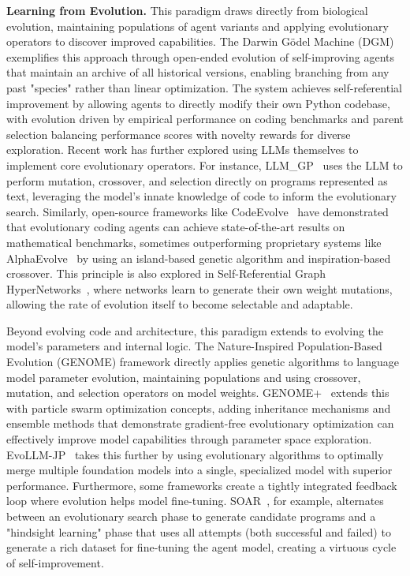 \textbf{Learning from Evolution.} 
This paradigm draws directly from biological evolution, maintaining populations of agent variants and applying evolutionary operators to discover improved capabilities. The Darwin Gödel Machine (DGM) \citep{zhang2025darwin} exemplifies this approach through open-ended evolution of self-improving agents that maintain an archive of all historical versions, enabling branching from any past "species" rather than linear optimization. The system achieves self-referential improvement by allowing agents to directly modify their own Python codebase, with evolution driven by empirical performance on coding benchmarks and parent selection balancing performance scores with novelty rewards for diverse exploration. Recent work has further explored using LLMs themselves to implement core evolutionary operators. For instance, LLM\_GP~\citep{hemberg2024evolving} uses the LLM to perform mutation, crossover, and selection directly on programs represented as text, leveraging the model's innate knowledge of code to inform the evolutionary search. Similarly, open-source frameworks like CodeEvolve~\citep{assumpccao2025codeevolve} have demonstrated that evolutionary coding agents can achieve state-of-the-art results on mathematical benchmarks, sometimes outperforming proprietary systems like AlphaEvolve~\citep{novikov2025alphaevolve} by using an island-based genetic algorithm and inspiration-based crossover. This principle is also explored in Self-Referential Graph HyperNetworks~\citep{pedersen2025hypernetworks}, where networks learn to generate their own weight mutations, allowing the rate of evolution itself to become selectable and adaptable.

Beyond evolving code and architecture, this paradigm extends to evolving the model's parameters and internal logic. The Nature-Inspired Population-Based Evolution (GENOME) framework \citep{zhang2025nature} directly applies genetic algorithms to language model parameter evolution, maintaining populations and using crossover, mutation, and selection operators on model weights. GENOME+~\citep{zhang2025nature} extends this with particle swarm optimization concepts, adding inheritance mechanisms and ensemble methods that demonstrate gradient-free evolutionary optimization can effectively improve model capabilities through parameter space exploration. EvoLLM-JP~\citep{akiba2025evolutionary} takes this further by using evolutionary algorithms to optimally merge multiple foundation models into a single, specialized model with superior performance. Furthermore, some frameworks create a tightly integrated feedback loop where evolution helps model fine-tuning. SOAR~\citep{pourcel2025soar}, for example, alternates between an evolutionary search phase to generate candidate programs and a "hindsight learning" phase that uses all attempts (both successful and failed) to generate a rich dataset for fine-tuning the agent model, creating a virtuous cycle of self-improvement.




